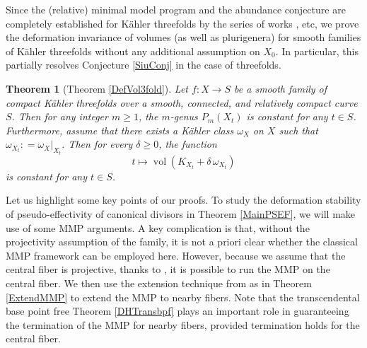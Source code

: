 \documentclass[12pt]{amsart}
\numberwithin{equation}{section}
\newtheorem{theorem} {Theorem} [section]
\theoremstyle{definition}
\theoremstyle{plain}
\newtheorem*{thm A*}{Theorem A}
\newtheorem*{thm B*}{Theorem B}
\newtheorem*{thm C*}{Theorem C}
\newtheorem*{thm D*}{Theorem D}
\theoremstyle{definition}
\renewcommand{\1}{\mathds{1}}
\renewcommand{\>}{\rightarrow}
\begin{document}
Since the (relative) minimal model program and the abundance conjecture are completely established for K\"ahler threefolds by the series of works \cite{HP16,CHP16,CHP23Erratum,DHY23,DH24,DHP24,DO24,DO24II,DH20}, etc, we prove the deformation invariance of volumes (as well as plurigenera) for smooth families of K\"ahler threefolds without any additional assumption on $X_0$. In particular, this partially resolves Conjecture \ref{SiuConj} in the case of threefolds.
\begin{theorem}[Theorem \ref{DefVol3fold}]\label{0DefVol3fold}
Let $f: X \to S$ be a smooth family of compact K\"ahler threefolds over a smooth, connected, and relatively compact curve $S$. Then for any integer $m\ge 1$, the $m$-genus $P_m(X_t)$ is constant for any $t\in S$. Furthermore, assume that there exists a K\"ahler class $\omega_X$ on $X$ such that $\omega_{X_t} :  =  \omega_X |_{X_t}$. Then for every $\delta\ge 0$, the function $$t \longmapsto \operatorname{vol}(K_{X_t}+\delta\,\omega_{X_t})$$is constant for any $t\in S$.
\end{theorem}
Let us highlight some key points of our proofs. To study the deformation stability of pseudo-effectivity of canonical divisors in Theorem \ref{MainPSEF}, we will make use of some MMP arguments. %
A key complication is that, without the projectivity assumption of the family, it is not a priori clear whether the classical MMP framework can be employed here. However, because we assume that the central fiber is projective, thanks to \cite{DH24MMP}, it is possible to run the MMP on the central fiber. We then use the extension technique from \cite[Theorem 2]{DefGeneralType} as in Theorem \ref{ExtendMMP} to extend the MMP to nearby fibers. Note that the transcendental base point free Theorem \ref{DHTransbpf} plays an important role in guaranteeing the termination of the MMP for nearby fibers, provided termination holds for the central fiber.
\end{document}
